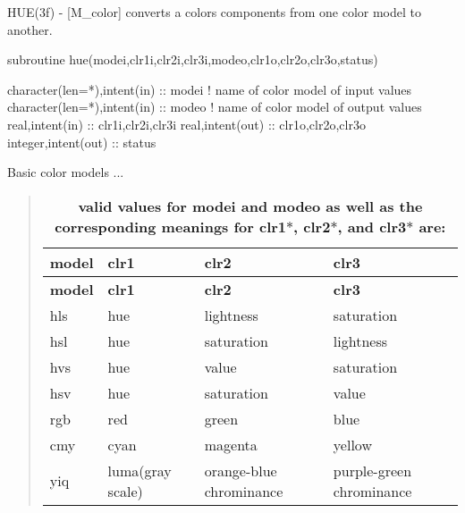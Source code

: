 \begin{DoxyDescription}
\item[\label{_HUE}%
N\+A\+ME ]H\+U\+E(3f) -\/ \mbox{[}M\+\_\+color\mbox{]} converts a color\textquotesingle{}s components from one color model to another. 


\item[S\+Y\+N\+O\+P\+S\+IS ]
\begin{DoxyPre}
    subroutine hue(modei,clr1i,clr2i,clr3i,modeo,clr1o,clr2o,clr3o,status)\end{DoxyPre}



\begin{DoxyPre}     character(len=*),intent(in) :: modei  ! name of color model of input values
     character(len=*),intent(in) :: modeo  ! name of color model of output values
     real,intent(in)             :: clr1i,clr2i,clr3i
     real,intent(out)            :: clr1o,clr2o,clr3o
     integer,intent(out)         :: status
    \end{DoxyPre}
 


\item[D\+E\+S\+C\+R\+I\+P\+T\+I\+ON ]Basic color models ... ~\newline
~\newline


\begin{quote}

\tabulinesep=1mm
\begin{longtabu} spread 0pt [c]{*{4}{|X[-1]}|}
\caption{{\bfseries  valid values for modei and modeo as well as the corresponding meanings for clr1$\ast$, clr2$\ast$, and clr3$\ast$ are\+: }}\label{_}\\
\hline
\rowcolor{\tableheadbgcolor}\textbf{ model  }&\textbf{ clr1  }&\textbf{ clr2  }&\textbf{ clr3   }\\
\endfirsthead
\hline
\endfoot
\hline
\rowcolor{\tableheadbgcolor}\textbf{ model  }&\textbf{ clr1  }&\textbf{ clr2  }&\textbf{ clr3   }\\
\endhead
hls  &hue  &lightness  &saturation   \\
hsl  &hue  &saturation  &lightness   \\
hvs  &hue  &value  &saturation   \\
hsv  &hue  &saturation  &value   \\
rgb  &red  &green  &blue   \\
cmy  &cyan  &magenta  &yellow   \\
yiq  &luma(gray scale)  &orange-\/blue chrominance  &purple-\/green chrominance   \\
\end{longtabu}
\end{quote}




\end{DoxyDescription}
